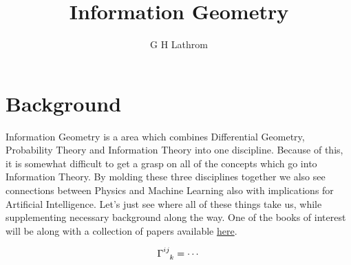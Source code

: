 \documentclass[12pt,letterpaper]{article}
\title{Information Geometry}
\author{G H Lathrom}
\begin{document}
\maketitle



\pagestyle{fancy}
\fancyhf{}
\chead{}
\fancyfoot[C]{\thepage}
\renewcommand{\headrulewidth}{.5pt}

\section{Background}

Information Geometry is a area which combines Differential Geometry, Probability Theory and Information Theory into one discipline.  
Because of this, it is somewhat difficult to get a grasp on all of the concepts which go into Information Theory.  
By molding these three disciplines together we also see connections between Physics and Machine Learning also with implications for Artificial Intelligence.
Let's just see where all of these things take us, while supplementing necessary background along the way.
One of the books of interest will be \cite{dodson} along with a collection of papers available \href{https://mega.nz/folder/5w0CDDzR\#EUMxMbyRJdNSKsqKIuEyFg}{here}.

\begin{equation*}
    \tensor{\Gamma}{^{ij}_{k}} = \cdots
\end{equation*}



\end{document}
